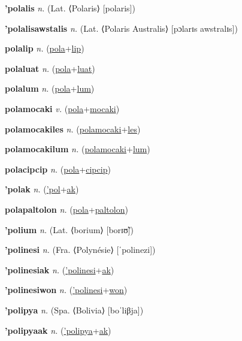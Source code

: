 \textbf{\hypertarget{'polalis}{'polalis}} \textit{n.} (Lat. ⟨Polaris⟩ [polaris])


\textbf{\hypertarget{'polalisawstalis}{'polalisawstalis}} \textit{n.} (Lat. ⟨Polaris Australis⟩ [pɔlarɪs awstralɪs])


\textbf{\hypertarget{polalip}{polalip}} \textit{n.} (\hyperlink{pola}{pola}+\allowbreak \hyperlink{lip}{lip})


\textbf{\hypertarget{polaluat}{polaluat}} \textit{n.} (\hyperlink{pola}{pola}+\allowbreak \hyperlink{luat}{luat})


\textbf{\hypertarget{polalum}{polalum}} \textit{n.} (\hyperlink{pola}{pola}+\allowbreak \hyperlink{lum}{lum})


\textbf{\hypertarget{polamocaki}{polamocaki}} \textit{v.} (\hyperlink{pola}{pola}+\allowbreak \hyperlink{mocaki}{mocaki})


\textbf{\hypertarget{polamocakiles}{polamocakiles}} \textit{n.} (\hyperlink{polamocaki}{polamocaki}+\allowbreak \hyperlink{les}{les})


\textbf{\hypertarget{polamocakilum}{polamocakilum}} \textit{n.} (\hyperlink{polamocaki}{polamocaki}+\allowbreak \hyperlink{lum}{lum})


\textbf{\hypertarget{polacipcip}{polacipcip}} \textit{n.} (\hyperlink{pola}{pola}+\allowbreak \hyperlink{cipcip}{cipcip})


\textbf{\hypertarget{'polak}{'polak}} \textit{n.} (\hyperlink{'pol}{'pol}+\allowbreak \hyperlink{ak}{ak})


\textbf{\hypertarget{polapaltolon}{polapaltolon}} \textit{n.} (\hyperlink{pola}{pola}+\allowbreak \hyperlink{paltolon}{paltolon})


\textbf{\hypertarget{'polium}{'polium}} \textit{n.} (Lat. ⟨borium⟩ [borɪʊ̃])


\textbf{\hypertarget{'polinesi}{'polinesi}} \textit{n.} (Fra. ⟨Polynésie⟩ [ˈpolinezi])


\textbf{\hypertarget{'polinesiak}{'polinesiak}} \textit{n.} (\hyperlink{'polinesi}{'polinesi}+\allowbreak \hyperlink{ak}{ak})


\textbf{\hypertarget{'polinesiwon}{'polinesiwon}} \textit{n.} (\hyperlink{'polinesi}{'polinesi}+\allowbreak \hyperlink{won}{won})


\textbf{\hypertarget{'polipya}{'polipya}} \textit{n.} (Spa. ⟨Bolivia⟩ [boˈliβja])


\textbf{\hypertarget{'polipyaak}{'polipyaak}} \textit{n.} (\hyperlink{'polipya}{'polipya}+\allowbreak \hyperlink{ak}{ak})


